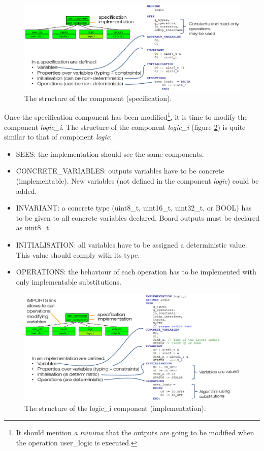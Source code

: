 \begin{figure}[ht]
\centering\includegraphics[scale=0.25]{Pictures/chapterProgramming/programming-spec.png}
\caption{The structure of the  component (specification).}
\label{programming:spec}
\end{figure}
Once the specification component has been modified\footnote{It should mention \textit{a minima} that the outputs are going to be modified when the operation user\_logic is executed.}, it is time to modify the component \textit{logic\_i}. 
The structure of the component \textit{logic\_i} (figure \ref{programming:implem}) is quite similar to that of component \textit{logic}:
\begin{itemize}
    \item SEES: the implementation should see the same components.
    \item CONCRETE\_VARIABLES: outputs variables have to be concrete (implementable). New variables (not defined in the component \textit{logic}) could be added.
    \item INVARIANT: a concrete type (uint8\_t, uint16\_t, uint32\_t, or BOOL) has to be given to all concrete variables declared. Board outputs must be declared as uint8\_t.
    \item INITIALISATION: all variables have to be assigned a deterministic value. This value should comply with its type.
    \item OPERATIONS: the behaviour of each operation has to be implemented with only implementable substitutions.
\end{itemize}
\begin{figure}[ht]
\centering\includegraphics[scale=0.25]{Pictures/chapterProgramming/programming-implem.png}
\caption{The structure of the logic\_i component (implementation).}
\label{programming:implem}
\end{figure}  

